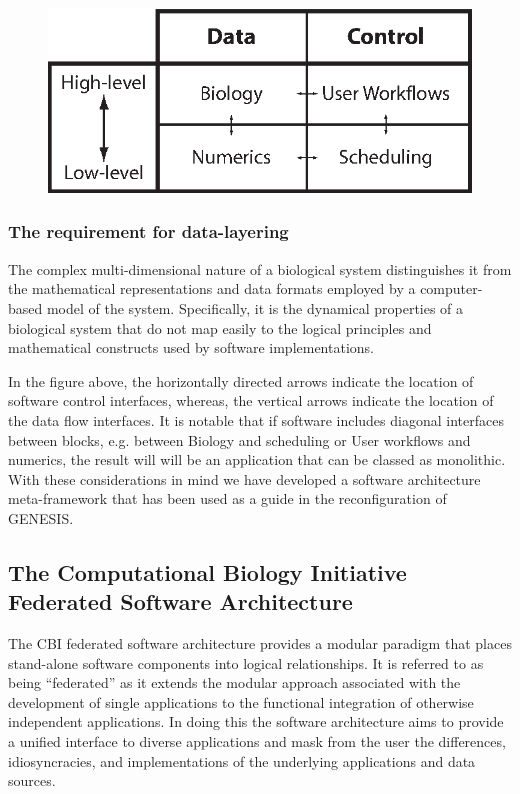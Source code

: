 \documentclass[12pt]{article}
\begin{document}
\begin{figure}[h]
  \centering
 \includegraphics[scale=0.95]{figures/G3-Data-Control.eps}
  \label{fig:datacontrol}
\end{figure}

\subsubsection*{The requirement for data-layering}
\label{sec:data-layering}
The complex multi-dimensional nature of a biological system distinguishes it from the mathematical representations and data formats employed by a computer-based model of the system. Specifically, it is the dynamical properties of a biological system that do not map easily to the logical principles and mathematical constructs used by software implementations.

In the figure above, the horizontally directed arrows indicate the location of software control interfaces, whereas, the vertical arrows indicate the location of the data flow interfaces. It is notable that if software includes diagonal interfaces between blocks, e.g. between Biology and scheduling or User workflows and numerics, the result will will be an application that can be classed as monolithic. With these considerations in mind we have developed a software architecture meta-framework that has been used as a guide in the reconfiguration of GENESIS.

\subsection*{The Computational Biology Initiative Federated Software Architecture}

The CBI federated software architecture provides a modular paradigm that places stand-alone software components into logical relationships. It is referred to as being ``federated'' as it extends the modular approach  associated with the development of single applications to the functional integration of otherwise independent applications. In doing this the software architecture aims to provide a unified interface to diverse applications and mask from the user the differences, idiosyncracies, and implementations of the underlying applications and data sources.
\end{document}
